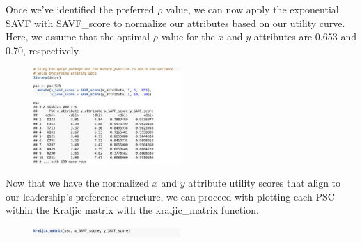 \documentclass[twocolumn]{svjour3}       %
\begin{document}
Once we've identified the preferred $\rho$ value, we can now apply the exponential SAVF with SAVF\_score to normalize our attributes based on our utility curve. Here, we assume that the optimal $\rho$ value for the $x$ and $y$ attributes are 0.653 and 0.70, respectively.
% 
% 
\begin{figure}[!htb]
  \includegraphics[width=0.5\textwidth]{code8.png}
\end{figure}

Now that we have the normalized $x$ and $y$ attribute utility scores that align to our leadership's preference structure, we can proceed with plotting each PSC within the Kraljic matrix with the kraljic\_matrix function.
\begin{figure}[!htb]
  \includegraphics[width=0.5\textwidth]{code9.png}
\end{figure}
\end{document}
